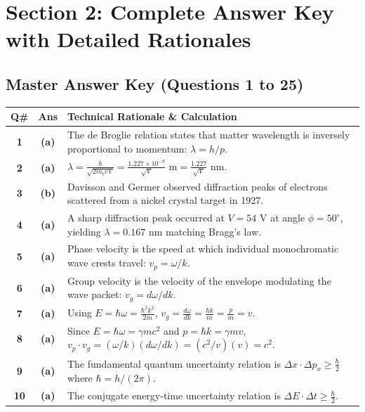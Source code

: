 \newpage
\section{Section 2: Complete Answer Key with Detailed Rationales}

\subsection*{Master Answer Key (Questions 1 to 25)}

{\small
\noindent\begin{tabularx}{\textwidth}{|c|c|X|}
\hline
\textbf{Q\#} & \textbf{Ans} & \textbf{Technical Rationale \& Calculation} \\
\hline
\textbf{1} & \textbf{(a)} & The de Broglie relation states that matter wavelength is inversely proportional to momentum: $\lambda = h/p$. \\ \hline
\textbf{2} & \textbf{(a)} & $\lambda = \frac{h}{\sqrt{2m_e e V}} = \frac{1.227 \times 10^{-9}}{\sqrt{V}}\text{ m} = \frac{1.227}{\sqrt{V}}\text{ nm}$. \\ \hline
\textbf{3} & \textbf{(b)} & Davisson and Germer observed diffraction peaks of electrons scattered from a nickel crystal target in 1927. \\ \hline
\textbf{4} & \textbf{(a)} & A sharp diffraction peak occurred at $V = 54\text{ V}$ at angle $\phi = 50^\circ$, yielding $\lambda = 0.167\text{ nm}$ matching Bragg's law. \\ \hline
\textbf{5} & \textbf{(a)} & Phase velocity is the speed at which individual monochromatic wave crests travel: $v_p = \omega/k$. \\ \hline
\textbf{6} & \textbf{(a)} & Group velocity is the velocity of the envelope modulating the wave packet: $v_g = d\omega/dk$. \\ \hline
\textbf{7} & \textbf{(a)} & Using $E = \hbar\omega = \frac{\hbar^2 k^2}{2m}$, $v_g = \frac{d\omega}{dk} = \frac{\hbar k}{m} = \frac{p}{m} = v$. \\ \hline
\textbf{8} & \textbf{(a)} & Since $E = \hbar\omega = \gamma m c^2$ and $p = \hbar k = \gamma m v$, $v_p \cdot v_g = (\omega/k)(d\omega/dk) = (c^2/v)(v) = c^2$. \\ \hline
\textbf{9} & \textbf{(a)} & The fundamental quantum uncertainty relation is $\Delta x \cdot \Delta p_x \ge \frac{\hbar}{2}$ where $\hbar = h/(2\pi)$. \\ \hline
\textbf{10} & \textbf{(a)} & The conjugate energy-time uncertainty relation is $\Delta E \cdot \Delta t \ge \frac{\hbar}{2}$. \\ \hline

\end{tabularx}}
